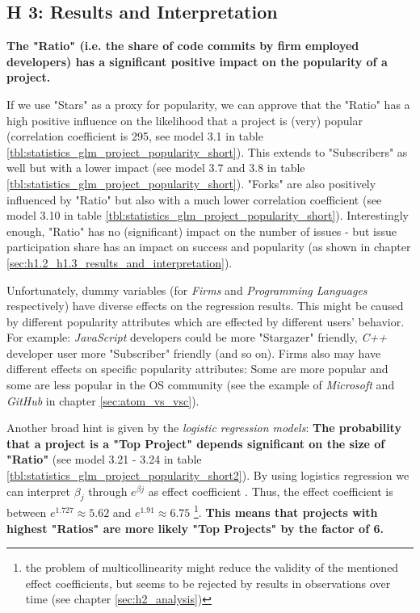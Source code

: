 \clearpage
\normalsize

\subsection{H 3: Results and Interpretation}

\textbf{The "Ratio" (i.e. the share of code commits by firm employed developers) has a significant positive impact on the popularity of a project.}

If we use "Stars" as a proxy for popularity, we can approve that the "Ratio" has a high positive influence on the likelihood that a project is (very) popular (correlation coefficient is 295, see model 3.1 in table \ref{tbl:statistics_glm_project_popularity_short}). This extends to "Subscribers" as well but with a lower impact (see model 3.7 and 3.8 in table \ref{tbl:statistics_glm_project_popularity_short}). "Forks" are also positively influenced by "Ratio" but also with a much lower correlation coefficient (see model 3.10 in table \ref{tbl:statistics_glm_project_popularity_short}). Interestingly enough, "Ratio" has no (significant) impact on the number of issues - but issue participation share has an impact on success and popularity (as shown in chapter \ref{sec:h1.2_h1.3_results_and_interpretation}).

Unfortunately, dummy variables (for \textit{Firms} and \textit{Programming Languages} respectively) have diverse effects on the regression results. This might be caused by different popularity attributes which are effected by different users' behavior. For example: \textit{JavaScript} developers could be more "Stargazer" friendly, \textit{C++} developer user more "Subscriber" friendly (and so on). Firms also may have different effects on specific popularity attributes: Some are more popular and some are less popular in the OS community (see the example of \textit{Microsoft} and \textit{GitHub} in chapter \ref{sec:atom_vs_vsc}).

Another broad hint is given by the \textit{logistic regression models}: \textbf{The probability that a project is a "Top Project" depends significant on the size of "Ratio"} (see model 3.21 - 3.24 in table \ref{tbl:statistics_glm_project_popularity_short2}). By using logistics regression we can interpret $\beta_{j}$ through $e^{\beta{j}}$ as effect coefficient \cite[p. 71]{agresti2007introduction}. Thus, the effect coefficient is between $e^{1.727} \approx 5.62$ and $e^{1.91} \approx 6.75$ \footnote{the problem of multicollinearity might reduce the validity of the mentioned effect coefficients, but seems to be rejected by results in observations over time (see chapter \ref{sec:h2_analysis})}.
 \textbf{This means that projects with highest "Ratios" are more likely "Top Projects" by the factor of 6.}
